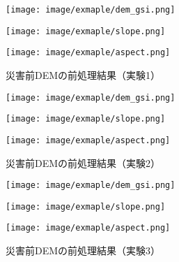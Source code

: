       \begin{figure}[t]
        \begin{minipage}[c]{0.329\hsize}
          \centering
          \texttt{[image: image/exmaple/dem\_gsi.png]}
        \end{minipage}
        \begin{minipage}[c]{0.329\hsize}
          \centering
          \texttt{[image: image/exmaple/slope.png]}
        \end{minipage}
        \begin{minipage}[c]{0.329\hsize}
          \centering
          \texttt{[image: image/exmaple/aspect.png]}
        \end{minipage}
        \caption{災害前DEMの前処理結果（実験1）}
        \label{災害前DEMの前処理結果（実験1）}
      \end{figure}

      \begin{figure}[t]
        \begin{minipage}[c]{0.329\hsize}
          \centering
          \texttt{[image: image/exmaple/dem\_gsi.png]}
        \end{minipage}
        \begin{minipage}[c]{0.329\hsize}
          \centering
          \texttt{[image: image/exmaple/slope.png]}
        \end{minipage}
        \begin{minipage}[c]{0.329\hsize}
          \centering
          \texttt{[image: image/exmaple/aspect.png]}
        \end{minipage}
        \caption{災害前DEMの前処理結果（実験2）}
      \end{figure}

      \begin{figure}[t]
        \begin{minipage}[c]{0.329\hsize}
          \centering
          \texttt{[image: image/exmaple/dem\_gsi.png]}
        \end{minipage}
        \begin{minipage}[c]{0.329\hsize}
          \centering
          \texttt{[image: image/exmaple/slope.png]}
        \end{minipage}
        \begin{minipage}[c]{0.329\hsize}
          \centering
          \texttt{[image: image/exmaple/aspect.png]}
        \end{minipage}
        \caption{災害前DEMの前処理結果（実験3）}
        \label{災害前DEMの前処理結果（実験3）}
      \end{figure}


